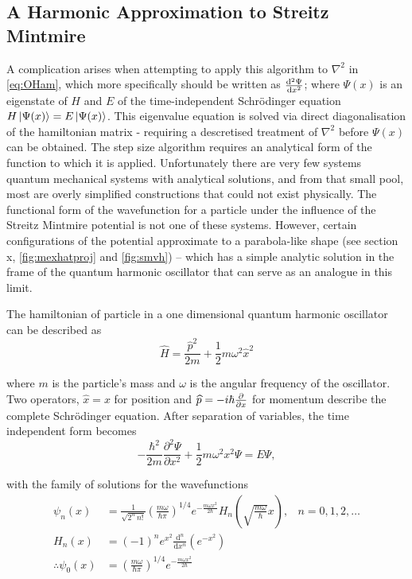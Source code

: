 \subsection{A Harmonic Approximation to Streitz Mintmire}\label{subsec:harmsm}

A complication arises when attempting to apply this algorithm to $\nabla^2$ in \cref{eq:OHam}, which more specifically should be written as $\cramped{\frac{\mathrm{d}^2\Psi}{\mathrm{d}x^2}}$; where $\Psi(x)$ is an eigenstate of $H$ and $E$ of the time-independent Schr\"odinger equation $H\left\lvert \Psi(x) \right\rangle = E\left\lvert \Psi(x) \right\rangle$. 
This eigenvalue equation is solved via direct diagonalisation of the hamiltonian matrix - requiring a descretised treatment of $\nabla^2$ before $\Psi(x)$ can be obtained.
The step size algorithm requires an analytical form of the function to which it is applied.
Unfortunately there are very few systems quantum mechanical systems with analytical solutions, and from that small pool, most are overly simplified constructions that could not exist physically.
The functional form of the wavefunction for a particle under the influence of the Streitz Mintmire potential is not one of these systems.
However, certain configurations of the potential approximate to a parabola-like shape (see section x, \cref{fig:mexhatproj} and \cref{fig:smvh}) -- which has a simple analytic solution in the frame of the quantum harmonic oscillator that can serve as an analogue in this limit.

The hamiltonian of particle in a one dimensional quantum harmonic oscillator can be described as
\begin{equation}
\widehat{H} = \frac{\widehat{p}^2}{2m}+\frac{1}{2}m\omega^2\widehat{x}^2\label{eq:hamho}
\end{equation}

where $m$ is the particle's mass and $ω$ is the angular frequency of the oscillator.
Two operators, $\widehat{x} = x$ for position and $\cramped{\widehat{p} = -i\hbar \frac{\partial}{\partial x}}$ for momentum describe the complete Schr\"{o}dinger equation.
After separation of variables, the time independent form becomes
\begin{equation}
-\frac{\hbar^2}{2m}\frac{\partial^2 \Psi}{\partial x^2}+\frac{1}{2}m\omega^2x^2 \Psi = E\Psi,
\label{eq:hamti}
\end{equation}

with the family of solutions for the wavefunctions
\begin{align}\psi_n(x) &= \frac{1}{\sqrt{2^n\,n!}}\left(\frac{m\omega}{\hbar\pi}\right)^{1/4}e^{
- \frac{m\omega x^2}{2 \hbar}} H_n\left(\sqrt{\frac{m\omega}{\hbar}} x \right), &n = 0,1,2,\ldots \\
H_n(x) &= (-1)^n e^{x^2}\frac{\mathrm{d}^n}{\mathrm{d}x^n}\left(e^{-x^2}\right) \\
\therefore \psi_0(x) &= \left(\frac{m\omega}{\hbar\pi}\right)^{1/4}e^{
- \frac{m\omega x^2}{2 \hbar}} \label{eq:gshwfn}
\end{align}

